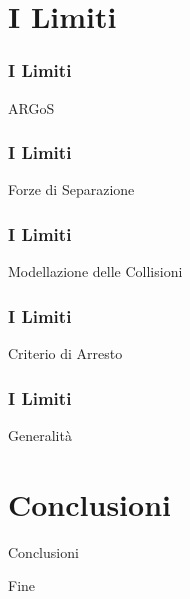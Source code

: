 \documentclass{beamer}
\begin{document}
\section{I Limiti}

\begin{frame}
\frametitle{I Limiti}
\centering
\Huge
ARGoS
\end{frame}

\begin{frame}
\frametitle{I Limiti}
\centering
\Huge
Forze di Separazione
\end{frame}

\begin{frame}
\frametitle{I Limiti}
\centering
\Huge
Modellazione delle Collisioni
\end{frame}

\begin{frame}
\frametitle{I Limiti}
\centering
\Huge
Criterio di Arresto
\end{frame}

\begin{frame}
\frametitle{I Limiti}
\centering
\Huge
Generalit\`a
\end{frame}

\section{Conclusioni}

\begin{frame}
\centering
\Huge
Conclusioni
\end{frame}

\begin{frame}
\centering
\Huge
Fine
\end{frame}
\end{document}
